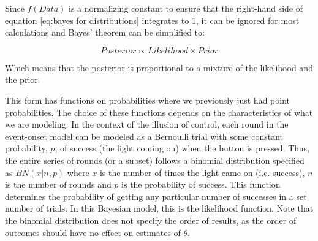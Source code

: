 \documentclass[USenglish,letterpaper,12pt,extrafontsizes,oneside,onecolumn,final]{memoir}
\begin{document}
Since $f(Data)$ is a normalizing constant to ensure that the right-hand side of equation \ref{eq:bayes for distributions} integrates to $1$, it can be ignored for most calculations and Bayes' theorem can be simplified to:

\begin{displaymath}
Posterior \propto Likelihood \times Prior
\end{displaymath}

Which means that the posterior is proportional to a mixture of the likelihood and the prior.  

This form has functions on probabilities where we previously just had point probabilities.  The choice of these functions depends on the characteristics of what we are modeling.  In the context of the illusion of control, each round in the event-onset model can be modeled as a Bernoulli trial with some constant probability, $p$, of success (the light coming on) when the button is pressed.  Thus, the entire series of rounds (or a subset) follows a binomial distribution specified as $BN(x|n,p)$  where $x$ is the number of times the light came on (i.e. success), $n$ is the number of rounds and $p$ is the probability of success.  This function determines the probability of getting any particular number of successes in a set number of trials.  In this Bayesian model, this is the likelihood function.  Note that the binomial distribution does not specify the order of results, as the order of outcomes should have no effect on estimates of $\theta$.
\end{document}
